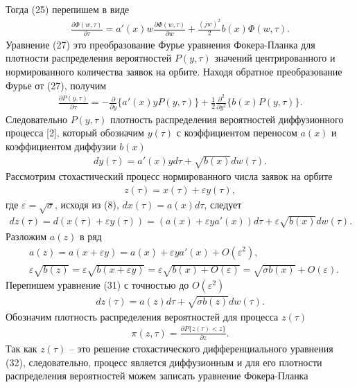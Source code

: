 Тогда (25) перепишем в виде
\begin{align}
	\frac{\partial \Phi (w,\tau)}{\partial \tau}=a'(x) w\frac{\partial \Phi (w,\tau)}{\partial w}+\frac{(jw)^2}{2}b(x)\Phi(w,\tau).
\end{align}
Уравнение (27) это преобразование Фурье уравнения Фокера-Планка для плотности распределения вероятностей $P(y, \tau )$ значений центрированного и нормированного количества заявок на орбите. Находя обратное преобразование Фурье от (27), получим
\begin{align}
	\frac{\partial P (y,\tau)}{\partial \tau}=-\frac{\partial}{\partial y}\{a'(x)yP(y,\tau)\} 
	+\frac{1}{2}\frac{\partial^2}{\partial y^2}\{b(x)P(y,\tau)\}.
\end{align}
Следовательно $P (y,\tau)$ плотность распределения вероятностей диффузионного процесса [2], который обозначим $y(\tau)$ с коэффициентом переносом $a(x)$ и коэффициентом диффузии $b(x)$
\begin{align}
	dy(\tau)=a'(x)yd\tau+\sqrt{b(x)}dw(\tau).
\end{align}
Рассмотрим стохастический процесс нормированного числа заявок на орбите
\begin{align}
	z(\tau)=x(\tau)+\varepsilon y(\tau),
\end{align}
где $\varepsilon=\sqrt{\sigma}$, исходя из (8), $dx(\tau)=a(x)d\tau$, следует
\begin{align}
	dz(\tau)=d(x(\tau)+\varepsilon y(\tau))=(a(x)+\varepsilon ya'(x))d\tau+\varepsilon \sqrt{b(x)}dw(\tau).
\end{align}
Разложим $a(z)$ в ряд 
\begin{align*}
	&a(z)=a(x+\varepsilon y)=a(x)+\varepsilon y a'(x)+O(\varepsilon^2),\\
	&\varepsilon\sqrt{b(z)}=\varepsilon\sqrt{b(x+\varepsilon y)}=\varepsilon\sqrt{b(x)+O(\varepsilon)}=\sqrt{\sigma b(x)}+O(\varepsilon).
\end{align*}
Перепишем уравнение (31) с точностью до $O(\varepsilon^2)$
\begin{align}
	dz(\tau)=a(z)d\tau+\sqrt{\sigma b(z)}dw(\tau).
\end{align}
Обозначим плотность распределения вероятностей для процесса $z(\tau)$
\begin{align*}
	\pi(z,\tau)=\frac{\partial P\{z(\tau)<z\}}{\partial z}.
\end{align*}
Так как $z(\tau)$ -- это решение стохастического дифференциального уравнения (32), следовательно, процесс является диффузионным и для его плотности распределения вероятностей можем записать уравнение Фокера-Планка
